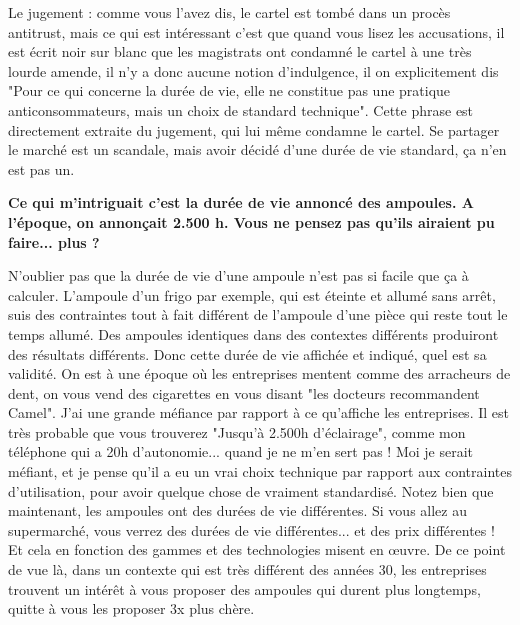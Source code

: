 \begin{small}
Le jugement : comme vous l'avez dis, le cartel est tombé dans un procès antitrust, mais ce qui est intéressant c'est que quand vous lisez les accusations, il est écrit noir sur blanc que les magistrats ont condamné le cartel à une très lourde amende, il n'y a donc aucune notion d'indulgence, il on explicitement dis "Pour ce qui concerne la durée de vie, elle ne constitue pas une pratique anticonsommateurs, mais un choix de standard technique". Cette phrase est directement extraite du jugement, qui lui même condamne le cartel. Se partager le marché est un scandale, mais avoir décidé d'une durée de vie standard, ça n'en est pas un.



\textbf{Ce qui m'intriguait c'est la  durée de vie annoncé des ampoules. A l'époque, on annonçait 2.500 h. Vous ne pensez pas qu'ils airaient pu faire... plus ?
}\smallbreak

N'oublier pas que la durée de vie d'une ampoule n'est pas si facile que ça à calculer. L'ampoule d'un frigo par exemple, qui est éteinte et allumé sans arrêt, suis des contraintes tout à fait différent de l'ampoule d'une pièce qui reste tout le temps allumé.
Des ampoules identiques dans des contextes différents produiront des résultats différents. Donc cette durée de vie affichée et indiqué, quel est sa validité. On est à une époque où les entreprises mentent comme des arracheurs de dent, on vous vend des cigarettes en vous disant "les docteurs recommandent Camel". J'ai une grande méfiance par rapport à ce qu'affiche les entreprises. Il est très probable que vous trouverez "Jusqu'à 2.500h d'éclairage", comme mon téléphone qui a 20h d'autonomie... quand je ne m'en sert pas !
Moi je serait méfiant, et je pense qu'il a eu un vrai choix technique par rapport aux contraintes d'utilisation, pour avoir quelque chose de vraiment standardisé.
Notez bien que maintenant, les ampoules ont des durées de vie différentes. Si vous allez au supermarché, vous verrez des durées de vie différentes... et des prix différentes ! Et cela en fonction des gammes et des technologies misent en œuvre.
De ce point de vue là, dans un contexte qui est très différent des années 30, les entreprises trouvent un intérêt à vous proposer des ampoules qui durent plus longtemps, quitte à vous les proposer 3x plus chère.


\end{small}
